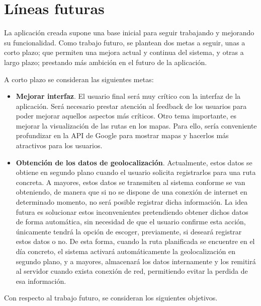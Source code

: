 \section{Líneas futuras}
La aplicación creada supone una base inicial para seguir trabajando y mejorando su funcionalidad. Como trabajo futuro, se plantean dos metas a seguir, unas a corto plazo; que permiten una mejora actual y continua del sistema, y otras a largo plazo; prestando más ambición en el futuro de la aplicación.

A corto plazo se consideran las siguientes metas:

\begin{itemize}

	\item \textbf{Mejorar interfaz}. El usuario final será muy crítico con la interfaz de la aplicación. Será necesario prestar atención al feedback de los usuarios para poder mejorar aquellos aspectos más críticos. Otro tema importante, es mejorar la visualización de las rutas en los mapas. Para ello, sería conveniente profundizar en la API de Google para mostrar mapas y hacerlos más atractivos para los usuarios.
	
	\item \textbf{Obtención de los datos de geolocalización}. Actualmente, estos datos se obtiene en segundo plano cuando el usuario solicita registrarlos para una ruta concreta. A mayores, estos datos se transmiten al sistema conforme se van obteniendo, de manera que si no se dispone de una conexión de internet en determinado momento, no será posible registrar dicha información. 
	La idea futura es solucionar estos inconvenientes pretendiendo obtener dichos datos de forma automática, sin necesidad de que el usuario confirme esta acción, únicamente tendrá la opción de escoger, previamente, si deseará registrar estos datos o no. De esta forma, cuando la ruta planificada se encuentre en el día concreto, el sistema activará automáticamente la geolocalización en segundo plano, y a mayores, almacenará los datos internamente y los remitirá al servidor cuando exista conexión de red, permitiendo evitar la perdida de esa información.

\end{itemize}

Con respecto al trabajo futuro, se consideran los siguientes objetivos.

